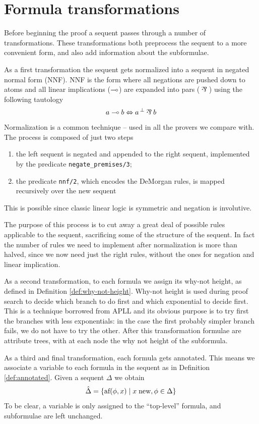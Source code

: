 \documentclass[a4paper, 12pt, tesi, english]{report}
\begin{document}
\section{Formula transformations}
Before beginning the proof a sequent passes through a number of transformations.
These transformations both preprocess the sequent to a more convenient form, and also add information about the subformulae.

As a first transformation the sequent gets normalized into a sequent in negated normal form (NNF).
NNF is the form where all negations are pushed down to atoms and all linear implications ($\multimap$) are expanded into pars ($\llpar$) using the following tautology
$$ a \lolli b \Leftrightarrow \llnot{a} \llpar b $$
Normalization is a common technique -- used in all the provers we compare with.
The process is composed of just two steps
\begin{enumerate}
	\item the left sequent is negated and appended to the right sequent, implemented by the predicate \texttt{negate\_premises/3};
	\item the predicate \texttt{nnf/2}, which encodes the DeMorgan rules, is mapped recursively over the new sequent
\end{enumerate}
This is possible since classic linear logic is symmetric and negation is involutive.

The purpose of this process is to cut away a great deal of possible rules applicable to the sequent, sacrificing some of the structure of the sequent.
In fact the number of rules we need to implement after normalization is more than halved, since we now need just the right rules, without the ones for negation and linear implication.

As a second transformation, to each formula we assign its why-not height, as defined in Definition \ref{def:why-not-height}.
Why-not height is used during proof search to decide which branch to do first and which exponential to decide first.
This is a technique borrowed from APLL and its obvious purpose is to try first the branches with less exponentials: in the case the first probably simpler branch fails, we do not have to try the other.
After this transformation formulae are attribute trees, with at each node the why not height of the subformula.

As a third and final transformation, each formula gets annotated.
This means we associate a variable to each formula in the sequent as in Definition \ref{def:annotated}.
Given a sequent $\Delta$ we obtain
$$ \hat{\Delta} = \{ \text{af}(\phi, x) \mid x \; \text{new}, \phi \in \Delta \} $$
To be clear, a variable is only assigned to the ``top-level'' formula, and subformulae are left unchanged.
\end{document}
